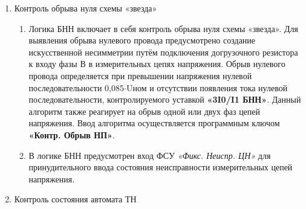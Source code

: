 \begin{enumerate}
\begin{enumerate}
\item
Сигнал обрыва трех фаз подхватывается энергонезависимым триггером при снижении напряжения прямой последовательности ниже уставки \textbf{«U1 мин БНН»}. Возврат цепи происходит после повторного повышения напряжения прямой последовательности более уставки \textbf{«U1 мин БНН»} (рекомендуемое значение уставки 0,1$\cdot$Uном). Если измерительные ТН установлены на линии, то дополнительно контролируется включенное положение выключателя.

\item
Для контроля одновременного исчезновения трех фазных напряжений используются три реле минимального напряжения в фазах А, В, С. Отсутствие напряжения определяется при снижении всех фазных напряжений меньше уставки \textbf{«Uф мин БНН»} в течение 5 секунд и наличии тока в защищаемой линии, определяемого по сработанному состоянию ИО УРОВ. Отсутствие напряжения действует на формирование сигнала обрыва трех фаз.

\end{enumerate}


\item Контроль обрыва нуля схемы «звезда»
\begin{enumerate}[label=\arabic{section}.\arabic{subsection}.\arabic{enumi}.\arabic*, labelsep=4pt, leftmargin=0em, itemindent=65pt, parsep=0pt]

\item
Логика БНН включает в себя контроль обрыва нуля схемы «звезда». Для выявления обрыва нулевого провода предусмотрено создание искусственной несимметрии путём подключения догрузочного резистора к входу фазы В в измерительных цепях напряжения. Обрыв нулевого провода определяется при превышении напряжения нулевой последовательности 0,085$\cdot$Uном и отсутствии появления тока нулевой последовательности, контролируемого уставкой \textbf{«3I0/I1 БНН»}. Данный алгоритм также реагирует на обрыв одной или двух фаз цепей напряжения. Ввод алгоритма осуществляется программным ключом \textbf{«Контр. Обрыв НП»}.

\item 
В логике БНН предусмотрен вход ФСУ \textit{«Фикс. Неиспр. ЦН»} для принудительного ввода состояния неисправности измерительных цепей напряжения.

\end{enumerate}


\item Контроль состояния автомата ТН 
\begin{enumerate}[label=\arabic{section}.\arabic{subsection}.\arabic{enumi}.\arabic*, labelsep=4pt, leftmargin=0em, itemindent=65pt, parsep=0pt]


\end{enumerate}
\end{enumerate}

